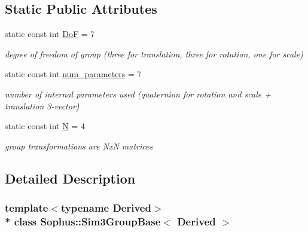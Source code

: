 \subsection*{Static Public Attributes}
\begin{DoxyCompactItemize}
\item 
static const int \hyperlink{class_sophus_1_1_sim3_group_base_a15603751ad5a1018653b7e33480c7325}{DoF} = 7\hypertarget{class_sophus_1_1_sim3_group_base_a15603751ad5a1018653b7e33480c7325}{}\label{class_sophus_1_1_sim3_group_base_a15603751ad5a1018653b7e33480c7325}

\begin{DoxyCompactList}\small\item\em degree of freedom of group (three for translation, three for rotation, one for scale) \end{DoxyCompactList}\item 
static const int \hyperlink{class_sophus_1_1_sim3_group_base_aefc3d24d00380466d815c254d299233a}{num\+\_\+parameters} = 7\hypertarget{class_sophus_1_1_sim3_group_base_aefc3d24d00380466d815c254d299233a}{}\label{class_sophus_1_1_sim3_group_base_aefc3d24d00380466d815c254d299233a}

\begin{DoxyCompactList}\small\item\em number of internal parameters used (quaternion for rotation and scale + translation 3-\/vector) \end{DoxyCompactList}\item 
static const int \hyperlink{class_sophus_1_1_sim3_group_base_a255dcef6539b58cd1b78ab90fa5899fb}{N} = 4\hypertarget{class_sophus_1_1_sim3_group_base_a255dcef6539b58cd1b78ab90fa5899fb}{}\label{class_sophus_1_1_sim3_group_base_a255dcef6539b58cd1b78ab90fa5899fb}

\begin{DoxyCompactList}\small\item\em group transformations are NxN matrices \end{DoxyCompactList}\end{DoxyCompactItemize}


\subsection{Detailed Description}
\subsubsection*{template$<$typename Derived$>$\\*
class Sophus\+::\+Sim3\+Group\+Base$<$ Derived $>$}

